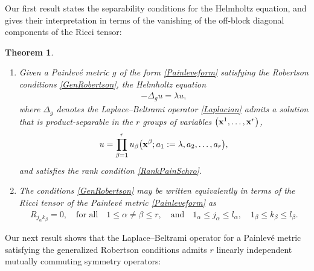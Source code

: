 \documentclass[pdftex]{sigma}
\numberwithin{equation}{section}
\newtheorem{Theorem}{Theorem}[section]
\begin{document}
Our first result states the separability conditions for the Helmholtz equation, and gives their interpretation in terms of the vanishing of the off-block diagonal components of the Ricci tensor:

\begin{Theorem}\label{maintheorem1}\quad
\begin{enumerate}\itemsep=0pt
\item[$1)$] Given a Painlev\'e metric $g$ of the form \eqref{Painleveform} satisfying the Robertson conditions \eqref{GenRobertson}, the Helmholtz equation
\begin{gather}\label{HelmPain}
-\Delta_{g} u =\lambda u,
\end{gather}
where $\Delta_{g}$ denotes the Laplace--Beltrami operator \eqref{Laplacian} admits a solution that is product-separab\-le in the $r$ groups of variables $\big({{\bf x}^{1}},\dots,{{\bf x}^{r}}\big)$,
\begin{gather}\label{sepform}
u=\prod_{\beta =1}^{r}u_{\beta}\big({\bf x}^{\beta};a_{1}:=\lambda,a_{2},\dots,a_{r}\big),
\end{gather}
and satisfies the rank condition \eqref{RankPainSchro}.

\item[$2)$] The conditions \eqref{GenRobertson} may be written equivalently in terms of the Ricci tensor of the Painlev\'e metric \eqref{Painleveform} as
\begin{gather}\label{Ricciform}
R_{j_{\alpha}k_{\beta}}=0, \quad {\mbox{for all}} \quad 1\leq \alpha \neq \beta \leq r, \quad {\mbox{and}} \quad 1_{\alpha}\leq j_{\alpha} \leq l_{\alpha}, \quad 1_{\beta}\leq k_{\beta}\leq l_{\beta}.
\end{gather}
\end{enumerate}
\end{Theorem}

Our next result shows that the Laplace--Beltrami operator for a Painlev\'e metric satisfying the generalized Robertson conditions admits $r$ linearly independent mutually commuting symmetry operators:
\end{document}
